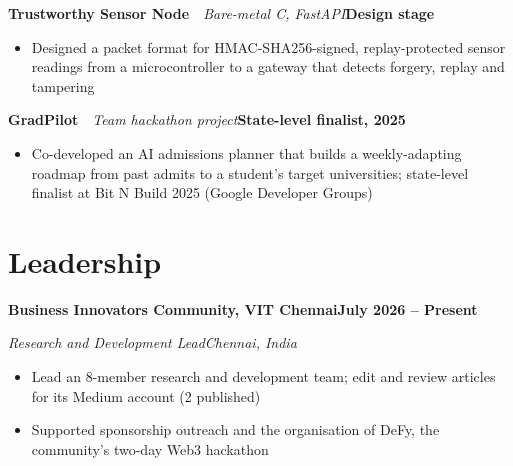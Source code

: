 \documentclass[10pt,a4paper]{article}
\newcommand{\entry}[2]{\textbf{#1}\hfill\textbf{#2}\par}
\newcommand{\role}[2]{\textit{#1}\hfill\textit{#2}\par}
\newcommand{\project}[3]{\textbf{#1}~\textbar~\textit{#2}\hfill\textbf{#3}\par}
\begin{document}
\vspace{2pt}
\project{Trustworthy Sensor Node}{Bare-metal C, FastAPI}{Design stage}
\begin{itemize}
  \item Designed a packet format for HMAC-SHA256-signed, replay-protected sensor readings from a microcontroller to a gateway that detects forgery, replay and tampering
\end{itemize}
\vspace{2pt}
\project{GradPilot}{Team hackathon project}{State-level finalist, 2025}
\begin{itemize}
  \item Co-developed an AI admissions planner that builds a weekly-adapting roadmap from past admits to a student's target universities; state-level finalist at Bit N Build 2025 (Google Developer Groups)
\end{itemize}

\section{Leadership}
\entry{Business Innovators Community, VIT Chennai}{July 2026 -- Present}
\role{Research and Development Lead}{Chennai, India}
\begin{itemize}
  \item Lead an 8-member research and development team; edit and review articles for its Medium account (2 published)
  \item Supported sponsorship outreach and the organisation of DeFy, the community's two-day Web3 hackathon
\end{itemize}
\end{document}

